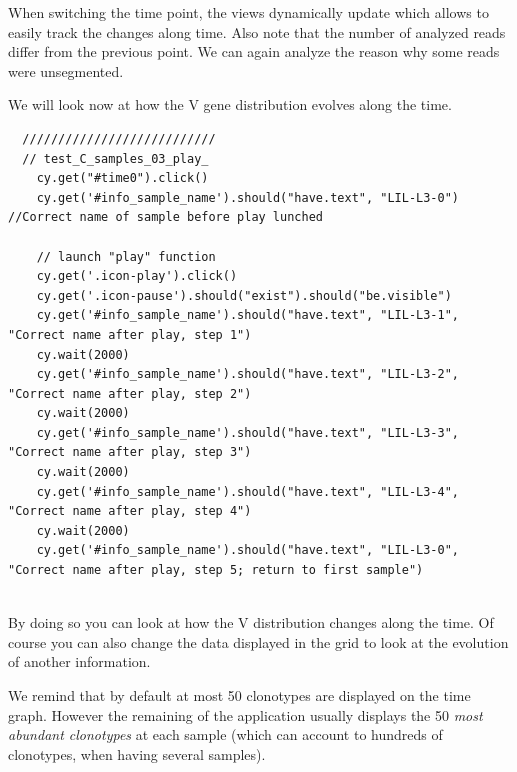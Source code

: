 When switching the time point, the views dynamically update which allows to
easily track the changes along time. Also note that the number of analyzed
reads differ from the previous point. We can again analyze the reason why some
reads were unsegmented.


\bigskip

We will look now at how the V gene distribution evolves along the time.
\begin{verbatim}
  ///////////////////////////
  // test_C_samples_03_play_
    cy.get("#time0").click()
    cy.get('#info_sample_name').should("have.text", "LIL-L3-0") //Correct name of sample before play lunched

    // launch "play" function
    cy.get('.icon-play').click()
    cy.get('.icon-pause').should("exist").should("be.visible")
    cy.get('#info_sample_name').should("have.text", "LIL-L3-1", "Correct name after play, step 1")
    cy.wait(2000)
    cy.get('#info_sample_name').should("have.text", "LIL-L3-2", "Correct name after play, step 2")
    cy.wait(2000)
    cy.get('#info_sample_name').should("have.text", "LIL-L3-3", "Correct name after play, step 3")
    cy.wait(2000)
    cy.get('#info_sample_name').should("have.text", "LIL-L3-4", "Correct name after play, step 4")
    cy.wait(2000)
    cy.get('#info_sample_name').should("have.text", "LIL-L3-0", "Correct name after play, step 5; return to first sample")


\end{verbatim}

By doing so you can look at how the V distribution changes along the time.
Of course you can also change the data displayed in the grid to look at
the evolution of another information.

\bigskip

We remind that by default at most 50 clonotypes are displayed
on the time graph. However the remaining of the application usually displays
the 50 \textit{most abundant clonotypes} at each sample (which can account to hundreds of
clonotypes, when having several samples).

